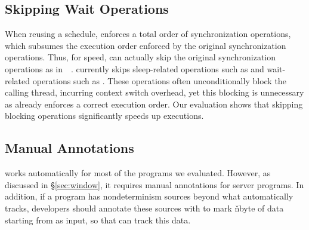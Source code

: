\subsection{Skipping Wait Operations} \label{sec:nowait}

When reusing a schedule, \peregrine enforces a total order of synchronization
operations, which subsumes the execution order enforced by the original
synchronization operations.  Thus, for speed, \peregrine can actually skip the
original synchronization operations as in~~\cite{cui:tern:osdi10}.
\peregrine currently skips sleep-related operations
such as  and wait-related operations such as
.  These operations often unconditionally block
the calling thread, incurring context switch overhead, yet this blocking
is unnecessary as \peregrine already enforces a correct execution order.  Our
evaluation shows that skipping blocking operations significantly speeds
up executions.

\subsection{Manual Annotations} \label{sec:func-summary}

\peregrine works automatically for most of the programs we evaluated.  However,
as discussed in \S\ref{sec:window}, it requires manual annotations for
server programs.  In addition, if a program has nondeterminism sources
beyond what \peregrine automatically tracks, developers should annotate these
sources with  to mark \v{nbyte} of
data starting from  as input, so that \peregrine can track this
data.

